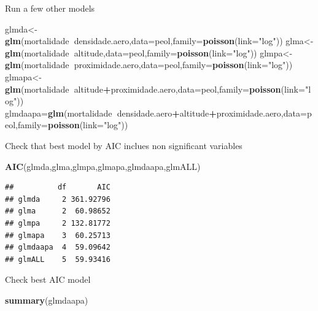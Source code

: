 \documentclass[
]{book}
\newenvironment{Shaded}{\begin{snugshade}}{\end{snugshade}}
\newcommand{\DataTypeTok}[1]{\textcolor[rgb]{0.13,0.29,0.53}{#1}}
\newcommand{\KeywordTok}[1]{\textcolor[rgb]{0.13,0.29,0.53}{\textbf{#1}}}
\newcommand{\NormalTok}[1]{#1}
\newcommand{\OperatorTok}[1]{\textcolor[rgb]{0.81,0.36,0.00}{\textbf{#1}}}
\newcommand{\StringTok}[1]{\textcolor[rgb]{0.31,0.60,0.02}{#1}}
\begin{document}
Run a few other models

\begin{Shaded}
\begin{Highlighting}[]
\NormalTok{glmda<-}\KeywordTok{glm}\NormalTok{(mortalidade}\OperatorTok{~}\NormalTok{densidade.aero,}\DataTypeTok{data=}\NormalTok{peol,}\DataTypeTok{family=}\KeywordTok{poisson}\NormalTok{(}\DataTypeTok{link=}\StringTok{"log"}\NormalTok{))}
\NormalTok{glma<-}\KeywordTok{glm}\NormalTok{(mortalidade}\OperatorTok{~}\NormalTok{altitude,}\DataTypeTok{data=}\NormalTok{peol,}\DataTypeTok{family=}\KeywordTok{poisson}\NormalTok{(}\DataTypeTok{link=}\StringTok{"log"}\NormalTok{))}
\NormalTok{glmpa<-}\KeywordTok{glm}\NormalTok{(mortalidade}\OperatorTok{~}\NormalTok{proximidade.aero,}\DataTypeTok{data=}\NormalTok{peol,}\DataTypeTok{family=}\KeywordTok{poisson}\NormalTok{(}\DataTypeTok{link=}\StringTok{"log"}\NormalTok{))}
\NormalTok{glmapa<-}\KeywordTok{glm}\NormalTok{(mortalidade}\OperatorTok{~}\NormalTok{altitude}\OperatorTok{+}\NormalTok{proximidade.aero,}\DataTypeTok{data=}\NormalTok{peol,}\DataTypeTok{family=}\KeywordTok{poisson}\NormalTok{(}\DataTypeTok{link=}\StringTok{"log"}\NormalTok{))}
\NormalTok{glmdaapa=}\KeywordTok{glm}\NormalTok{(mortalidade}\OperatorTok{~}\NormalTok{densidade.aero}\OperatorTok{+}\NormalTok{altitude}\OperatorTok{+}\NormalTok{proximidade.aero,}\DataTypeTok{data=}\NormalTok{peol,}\DataTypeTok{family=}\KeywordTok{poisson}\NormalTok{(}\DataTypeTok{link=}\StringTok{"log"}\NormalTok{))}
\end{Highlighting}
\end{Shaded}

Check that best model by AIC inclues non significant variables

\begin{Shaded}
\begin{Highlighting}[]
\KeywordTok{AIC}\NormalTok{(glmda,glma,glmpa,glmapa,glmdaapa,glmALL)}
\end{Highlighting}
\end{Shaded}

\begin{verbatim}
##          df       AIC
## glmda     2 361.92796
## glma      2  60.98652
## glmpa     2 132.81772
## glmapa    3  60.25713
## glmdaapa  4  59.09642
## glmALL    5  59.93416
\end{verbatim}

Check best AIC model

\begin{Shaded}
\begin{Highlighting}[]
\KeywordTok{summary}\NormalTok{(glmdaapa)}
\end{Highlighting}
\end{Shaded}
\end{document}
